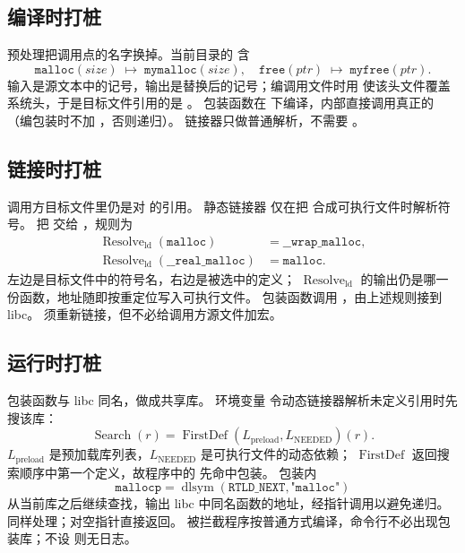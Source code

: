 \subsection{编译时打桩}

预处理把调用点的名字换掉。当前目录的  含
\[
\texttt{malloc}(\mathit{size})\;\mapsto\;\texttt{mymalloc}(\mathit{size}),
\quad
\texttt{free}(\mathit{ptr})\;\mapsto\;\texttt{myfree}(\mathit{ptr}).
\]
输入是源文本中的记号，输出是替换后的记号；编调用文件时用  使该头文件覆盖系统头，于是目标文件引用的是 。
包装函数在  下编译，内部直接调用真正的 （编包装时不加 ，否则递归）。
链接器只做普通解析，不需要 。

\subsection{链接时打桩}

调用方目标文件里仍是对  的引用。
静态链接器  仅在把  合成可执行文件时解析符号。
 把  交给 ，规则为
\begin{align*}
\operatorname{Resolve}_{\mathrm{ld}}(\texttt{malloc})
&=\texttt{\_\_wrap\_malloc},\\
\operatorname{Resolve}_{\mathrm{ld}}(\texttt{\_\_real\_malloc})
&=\texttt{malloc}.
\end{align*}
左边是目标文件中的符号名，右边是被选中的定义；
$\operatorname{Resolve}_{\mathrm{ld}}$ 的输出仍是哪一份函数，地址随即按重定位写入可执行文件。
包装函数调用 ，由上述规则接到 libc。
须重新链接，但不必给调用方源文件加宏。

\subsection{运行时打桩}

包装函数与 libc 同名，做成共享库。
环境变量  令动态链接器解析未定义引用时先搜该库：
\[
\operatorname{Search}(r)
=
\operatorname{FirstDef}(L_{\mathrm{preload}},L_{\mathrm{NEEDED}})(r).
\]
$L_{\mathrm{preload}}$ 是预加载库列表，$L_{\mathrm{NEEDED}}$ 是可执行文件的动态依赖；
$\operatorname{FirstDef}$ 返回搜索顺序中第一个定义，故程序中的  先命中包装。
包装内
\[
\texttt{mallocp}=\operatorname{dlsym}(\texttt{RTLD\_NEXT},\texttt{"malloc"})
\]
从当前库之后继续查找，输出 libc 中同名函数的地址，经指针调用以避免递归。
 同样处理；对空指针直接返回。
被拦截程序按普通方式编译，命令行不必出现包装库；不设  则无日志。

